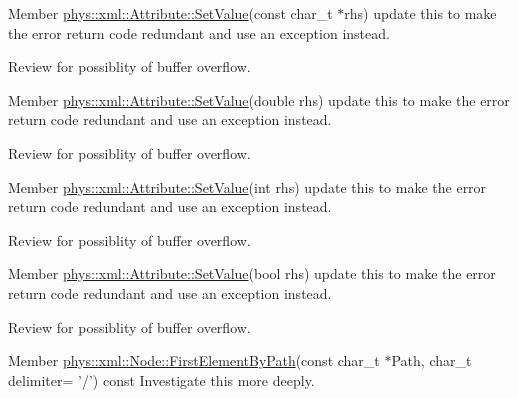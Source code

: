 \label{todo__todo000034}
\hypertarget{todo__todo000034}{}
 
\begin{DoxyDescription}
\item[Member \hyperlink{classphys_1_1xml_1_1Attribute_a470512fcd8b4f7609319bf85df100aaa}{phys::xml::Attribute::SetValue}(const char\_\-t $\ast$rhs) ]update this to make the error return code redundant and use an exception instead. 

Review for possiblity of buffer overflow. 
\end{DoxyDescription}

\label{todo__todo000037}
\hypertarget{todo__todo000037}{}
 
\begin{DoxyDescription}
\item[Member \hyperlink{classphys_1_1xml_1_1Attribute_a919034671f61ee408d616409a49dafca}{phys::xml::Attribute::SetValue}(double rhs) ]update this to make the error return code redundant and use an exception instead. 

Review for possiblity of buffer overflow. 
\end{DoxyDescription}

\label{todo__todo000035}
\hypertarget{todo__todo000035}{}
 
\begin{DoxyDescription}
\item[Member \hyperlink{classphys_1_1xml_1_1Attribute_a693f7bd8015866c3c4979101c343ce50}{phys::xml::Attribute::SetValue}(int rhs) ]update this to make the error return code redundant and use an exception instead. 

Review for possiblity of buffer overflow. 
\end{DoxyDescription}

\label{todo__todo000038}
\hypertarget{todo__todo000038}{}
 
\begin{DoxyDescription}
\item[Member \hyperlink{classphys_1_1xml_1_1Attribute_a6df4cf0f083482e69e4e6e94599a1d82}{phys::xml::Attribute::SetValue}(bool rhs) ]update this to make the error return code redundant and use an exception instead. 

Review for possiblity of buffer overflow. 
\end{DoxyDescription}

\label{todo__todo000048}
\hypertarget{todo__todo000048}{}
 
\begin{DoxyDescription}
\item[Member \hyperlink{classphys_1_1xml_1_1Node_af2a9ac5c4e3252dca0e17720de093a9a}{phys::xml::Node::FirstElementByPath}(const char\_\-t $\ast$Path, char\_\-t delimiter= '/') const  ]Investigate this more deeply. 
\end{DoxyDescription}

